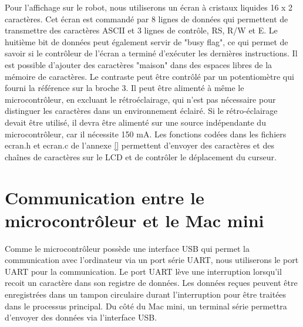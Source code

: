 Pour l'affichage sur le robot, nous utiliserons un écran à cristaux liquides 16 x 2  caractères. Cet écran est commandé par 8 lignes de données qui permettent de transmettre des caractères ASCII et 3 lignes de contrôle, RS, R/W et E. Le huitième bit de données peut également servir de "busy flag", ce qui permet de savoir si le contrôleur de l'écran a terminé d'exécuter les dernières instructions. Il est possible d'ajouter des caractères "maison" dans des espaces libres de la mémoire de caractères. Le contraste peut être contrôlé par un potentiomètre qui fourni la référence sur la broche 3. Il peut être alimenté à même le microcontrôleur, en excluant le rétroéclairage, qui n'est pas nécessaire pour distinguer les caractères dans un environnement éclairé. Si le rétro-éclairage devait être utilisé, il devra être alimenté sur une source indépendante du microcontrôleur, car il nécessite 150 mA. Les fonctions codées dans les fichiers ecran.h et ecran.c de l'annexe \ref{} permettent d'envoyer des caractères et des chaînes de caractères sur le LCD et de contrôler le déplacement du curseur.

\section{Communication entre le microcontrôleur et le Mac mini} \label{s:comm_mac_micro}

Comme le microcontrôleur possède une interface USB qui permet la communication avec l'ordinateur via un port série UART, nous utiliserons le port UART pour la communication. Le port UART lève une interruption lorsqu'il recoit un caractère dans son registre de données. Les données reçues peuvent être enregistrées dans un tampon circulaire durant l'interruption pour être traitées dans le processus principal. Du côté du Mac mini, un terminal série permettra d'envoyer des données via l'interface USB. 


